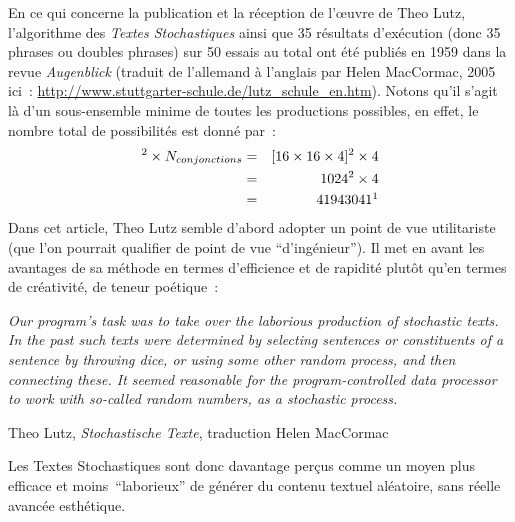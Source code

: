 \documentclass{article}
\newenvironment{citationbox}
{\begin{center}
		\begin{minipage}{.8\textwidth}
		}
		{
		\end{minipage}	
\end{center}
}
\begin{document}
				En ce qui concerne la publication et la réception de l'œuvre de Theo Lutz, l'algorithme des \textit{Textes Stochastiques} ainsi que 35 résultats d'exécution (donc 35 phrases ou doubles phrases) sur 50 essais au total ont été publiés en 1959 dans la revue \cite{lutz1959} \textit{Augenblick} (traduit de l'allemand à l'anglais par Helen MacCormac, 2005 ici : \href{http://www.stuttgarter-schule.de/lutz_schule_en.htm}{http://www.stuttgarter-schule.de/lutz\_schule\_en.htm}). Notons qu'il s'agit là d'un sous-ensemble minime de toutes les productions possibles, en effet, le nombre total de possibilités est donné par : 
				\begin{eqnarray*}
					[N_{Noms} \times N_{adjectifs} \times N_{Phrases}]^2 \times N_{conjonctions} &=& [16 \times 16 \times 4]^2 \times 4\\
					&=& 1024^2 \times 4\\
					&=& 41943041 \footnotemark \\
				\end{eqnarray*}	
				Dans cet article, Theo Lutz semble d'abord adopter un point de vue utilitariste (que  l'on pourrait qualifier de point de vue ``d'ingénieur''). Il met en avant les avantages de sa méthode en termes d'efficience et de rapidité plutôt qu'en termes de créativité, de teneur poétique :
				\begin{citationbox}
					\textit{Our program's task was to take over the laborious production of stochastic texts. In the past such texts were determined by selecting sentences or constituents of a sentence by throwing dice, or using some other random process, and then connecting these. It seemed reasonable for the program-controlled data processor to work with so-called random numbers, as a stochastic process.}
					\begin{flushright}
						Theo Lutz, \textit{Stochastische Texte}, traduction Helen MacCormac \cite{lutz1959}
					\end{flushright}
				\end{citationbox}
				Les Textes Stochastiques sont donc davantage perçus comme un moyen plus efficace et moins ``laborieux'' de générer du contenu textuel aléatoire, sans réelle avancée esthétique.\\
				
\end{document}

